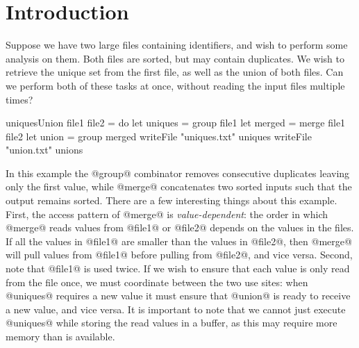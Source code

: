 \section{Introduction}
\label{s:Introduction}


Suppose we have two large files containing identifiers, and wish to perform some analysis on them.
Both files are sorted, but may contain duplicates.
We wish to retrieve the unique set from the first file, as well as the union of both files.
Can we perform both of these tasks at once, without reading the input files multiple times?

\begin{code}
uniquesUnion file1 file2
 = do   let uniques = group file1
        let merged  = merge file1 file2
        let union   = group merged
        writeFile "uniques.txt" uniques
        writeFile "union.txt"   unions
\end{code}


In this example the @group@ combinator removes consecutive duplicates leaving only the first value, while @merge@ concatenates two sorted inputs such that the output remains sorted.
There are a few interesting things about this example.
First, the access pattern of @merge@ is \emph{value-dependent}: the order in which @merge@ reads values from @file1@ or @file2@ depends on the values in the files.
If all the values in @file1@ are smaller than the values in @file2@, then @merge@ will pull values from @file1@ before pulling from @file2@, and vice versa.
Second, note that @file1@ is used twice.
If we wish to ensure that each value is only read from the file once, we must coordinate between the two use sites: when @uniques@ requires a new value it must ensure that @union@ is ready to receive a new value, and vice versa.
It is important to note that we cannot just execute @uniques@ while storing the read values in a buffer, as this may require more memory than is available.

